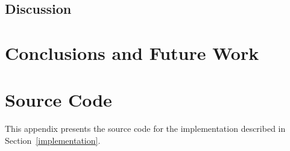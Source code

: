 \documentclass[a4paper,11pt]{article}
\newcommand{\Chapref}[1]{Section~\ref{#1}}
\begin{document}
\subsection{Discussion}
\label{evaluation:discussion}

\section{Conclusions and Future Work}
\label{conclusions}




\appendix
\section{Source Code}
\label{source code}

This appendix presents the source code for the implementation described in \Chapref{implementation}.
\end{document}
